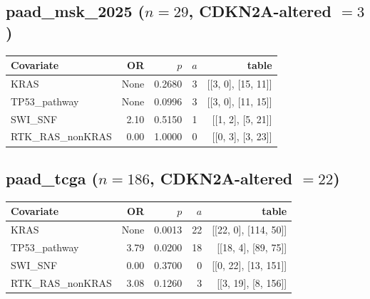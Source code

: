 \subsection{paad\_msk\_2025 ($n=29$, CDKN2A-altered $=3$)}
\begin{center}\begin{tabular}{lrrrr}
\hline\hline Covariate & OR & $p$ & $a$ & table \\ \hline
KRAS & None & 0.2680 & 3 & [[3, 0], [15, 11]] \\
TP53\_pathway & None & 0.0996 & 3 & [[3, 0], [11, 15]] \\
SWI\_SNF & 2.10 & 0.5150 & 1 & [[1, 2], [5, 21]] \\
RTK\_RAS\_nonKRAS & 0.00 & 1.0000 & 0 & [[0, 3], [3, 23]] \\
\hline\hline\end{tabular}\end{center}
\subsection{paad\_tcga ($n=186$, CDKN2A-altered $=22$)}
\begin{center}\begin{tabular}{lrrrr}
\hline\hline Covariate & OR & $p$ & $a$ & table \\ \hline
KRAS & None & 0.0013 & 22 & [[22, 0], [114, 50]] \\
TP53\_pathway & 3.79 & 0.0200 & 18 & [[18, 4], [89, 75]] \\
SWI\_SNF & 0.00 & 0.3700 & 0 & [[0, 22], [13, 151]] \\
RTK\_RAS\_nonKRAS & 3.08 & 0.1260 & 3 & [[3, 19], [8, 156]] \\
\hline\hline\end{tabular}\end{center}

